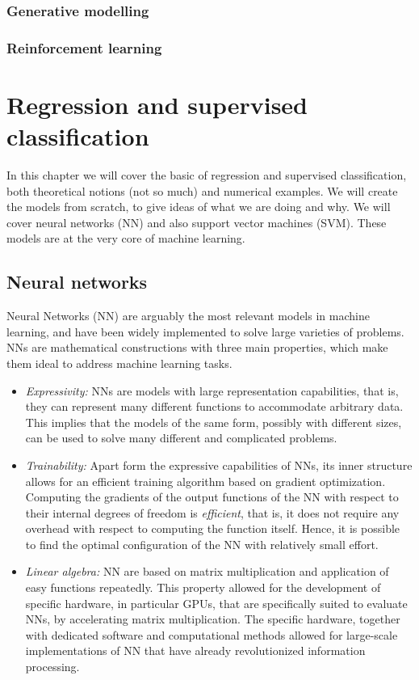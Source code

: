 \documentclass[]{report}
\begin{document}
\subsection{Generative modelling}

\subsection{Reinforcement learning}

\chapter{Regression and supervised classification}

In this chapter we will cover the basic of regression and supervised classification, both theoretical notions (not so much) and numerical examples. We will create the models from scratch, to give ideas of what we are doing and why. We will cover neural networks (NN) and also support vector machines (SVM). These models are at the very core of machine learning. 

\section{Neural networks}\label{sec.neural-networks}

Neural Networks (NN) are arguably the most relevant models in machine learning, and have been widely implemented to solve large varieties of problems. NNs are mathematical constructions with three main properties, which make them ideal to address machine learning tasks.

\begin{itemize}
\item \textit{Expressivity:} NNs are models with large representation capabilities, that is, they can represent many different functions to accommodate arbitrary data. This implies that the models of the same form, possibly with different sizes, can be used to solve many different and complicated problems. 
\item \textit{Trainability:} Apart form the expressive capabilities of NNs, its inner structure allows for an efficient training algorithm based on gradient optimization. Computing the gradients of the output functions of the NN with respect to their internal degrees of freedom is \textit{efficient}, that is, it does not require any overhead with respect to computing the function itself. Hence, it is possible to find the optimal configuration of the NN with relatively small effort. 
\item \textit{Linear algebra:} NN are based on matrix multiplication and application of easy functions repeatedly. This property allowed for the development of specific hardware, in particular GPUs, that are specifically suited to evaluate NNs, by accelerating matrix multiplication. The specific hardware, together with dedicated software and computational methods allowed for large-scale implementations of NN that have already revolutionized information processing. 
\end{itemize}
\end{document}
